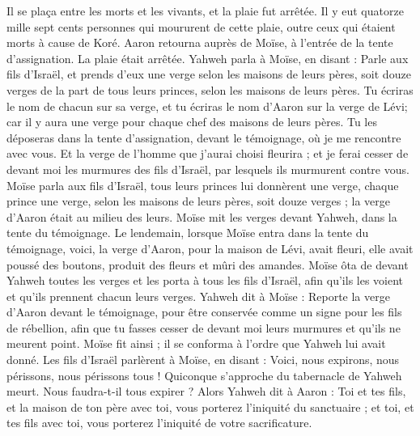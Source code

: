 \begin{multicols}{2}
Il se plaça entre les morts et les vivants, et la plaie fut arrêtée.
Il y eut quatorze mille sept cents personnes qui moururent de cette plaie, outre ceux qui étaient morts à cause de Koré.
Aaron retourna auprès de Moïse, à l'entrée de la tente d'assignation. La plaie était arrêtée.
\VerseOne{}Yahweh parla à Moïse, en disant :
Parle aux fils d'Israël, et prends d’eux une verge selon les maisons de leurs pères, soit douze verges de la part de tous leurs princes, selon les maisons de leurs pères. Tu écriras le nom de chacun sur sa verge,
et tu écriras le nom d'Aaron sur la verge de Lévi; car il y aura une verge pour chaque chef des maisons de leurs pères.
Tu les déposeras dans la tente d'assignation, devant le témoignage, où je me rencontre avec vous.
Et la verge de l'homme que j'aurai choisi fleurira ; et je ferai cesser de devant moi les murmures des fils d'Israël, par lesquels ils murmurent contre vous.
Moïse parla aux fils d'Israël, tous leurs princes lui donnèrent une verge, chaque prince une verge, selon les maisons de leurs pères, soit douze verges ; la verge d'Aaron était au milieu des leurs.
Moïse mit les verges devant Yahweh, dans la tente du témoignage.
Le lendemain, lorsque Moïse entra dans la tente du témoignage, voici, la verge d'Aaron, pour la maison de Lévi, avait fleuri, elle avait poussé des boutons, produit des fleurs et mûri des amandes.
Moïse ôta de devant Yahweh toutes les verges et les porta à tous les fils d'Israël, afin qu’ils les voient et qu’ils prennent chacun leurs verges.
Yahweh dit à Moïse : Reporte la verge d'Aaron devant le témoignage, pour être conservée comme un signe pour les fils de rébellion, afin que tu fasses cesser de devant moi leurs murmures et qu’ils ne meurent point.
Moïse fit ainsi ; il se conforma à l’ordre que Yahweh lui avait donné.
Les fils d'Israël parlèrent à Moïse, en disant : Voici, nous expirons, nous périssons, nous périssons tous !
Quiconque s'approche du tabernacle de Yahweh meurt. Nous faudra-t-il tous expirer ?
\VerseOne{}Alors Yahweh dit à Aaron : Toi et tes fils, et la maison de ton père avec toi, vous porterez l’iniquité du sanctuaire ; et toi, et tes fils avec toi, vous porterez l’iniquité de votre sacrificature.

\end{multicols}
